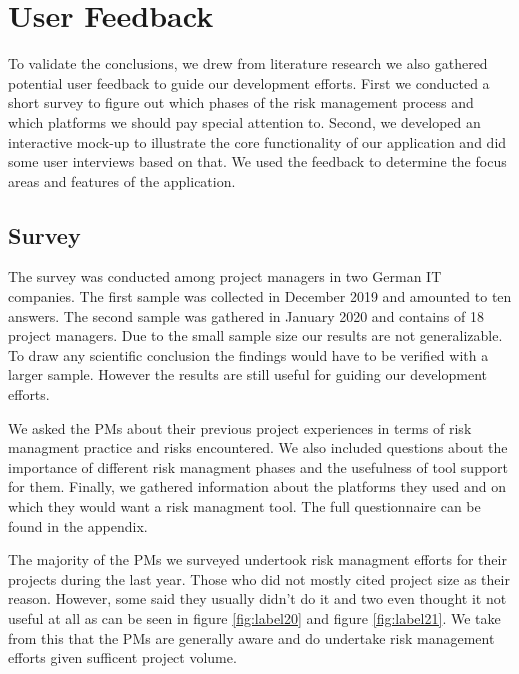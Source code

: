 
\section{User Feedback}
\label{sec:DomainA}
To validate the conclusions, we drew from literature research we also gathered potential user feedback to guide our development efforts. First we conducted a short survey to figure out which phases of the risk management process and which platforms we should pay special attention to. Second, we developed an interactive mock-up to illustrate the core functionality of our application and did some user interviews based on that. We used the feedback to determine the focus areas and features of the application.
\subsection{Survey}
\label{sec:DomainAa}
The survey was conducted among project managers in two German IT companies. The first sample was collected in December 2019 and amounted to ten answers. The second sample was gathered in January 2020 and contains of 18 project managers. Due to the small sample size our results are not generalizable. To draw any scientific conclusion the findings would have to be verified with a larger sample. However the results are still useful for guiding our development efforts.

We asked the PMs about their previous project experiences in terms of risk managment practice and risks encountered. We also included questions about the importance of different risk managment phases and the usefulness of tool support for them. Finally, we gathered information about the platforms they used and on which they would want a risk managment tool. The full questionnaire can be found in the appendix.

The majority of the PMs we surveyed undertook risk managment efforts for their projects during the last year. Those who did not mostly cited project size as their reason. However, some said they usually didn't do it and two even thought it not useful at all as can be seen in figure \ref{fig:label20} and figure \ref{fig:label21}. We take from this that the PMs are generally aware and do undertake risk management efforts given sufficent project volume.

